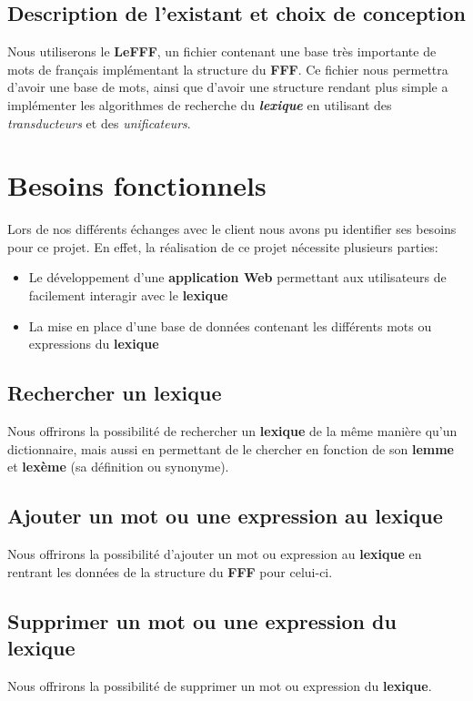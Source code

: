 \documentclass[a4paper, 12pt]{article}
\begin{document}
\subsection{Description de l'existant et choix de conception}
{Nous utiliserons le \textbf{LeFFF}, un fichier contenant une base très importante de mots de français implémentant la structure du \textbf{FFF}. Ce fichier nous permettra d'avoir une base de mots, ainsi que d'avoir une structure rendant plus simple a implémenter les algorithmes de recherche du \textit{\bf lexique} en utilisant des \textit{transducteurs} et des \textit{unificateurs}.\par}

\section{Besoins fonctionnels}
Lors de nos différents échanges avec le client nous avons pu identifier ses besoins pour ce projet. En effet, la réalisation de ce projet nécessite plusieurs parties:
\begin{itemize}
\item Le développement d'une \textbf{application Web} permettant aux utilisateurs de facilement interagir avec le \textbf{lexique}
\item La mise en place d'une base de données contenant les différents mots ou expressions du \textbf{lexique}
\end{itemize}


\subsection{Rechercher un lexique}

{Nous offrirons la possibilité de rechercher un \textbf{lexique} de la même manière qu'un dictionnaire, mais aussi en permettant de le chercher en fonction de son \textbf{lemme} et \textbf{lexème} (sa définition ou synonyme).\par}

\subsection{Ajouter un mot ou une expression au lexique}

{Nous offrirons la possibilité d'ajouter un mot ou expression au \textbf{lexique} en rentrant les données de la structure du \textbf{FFF} pour celui-ci.\par}

\subsection{Supprimer un mot ou une expression du lexique}
{Nous offrirons la possibilité de supprimer un mot ou expression du \textbf{lexique}.\par}
\end{document}
